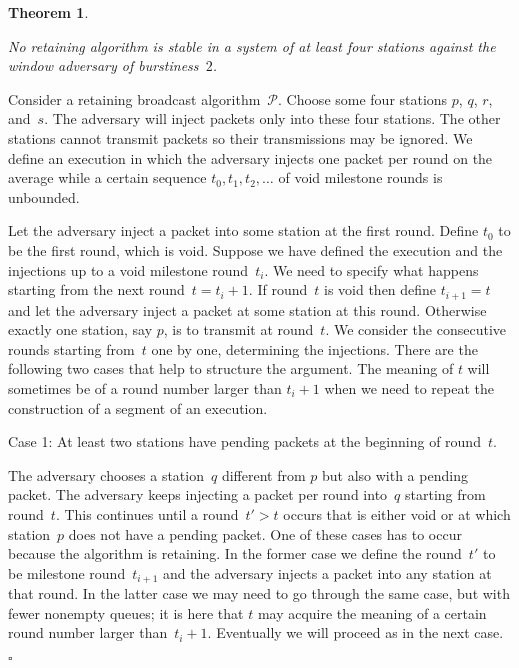 \documentclass[11pt]{article}
\newcommand{\cP}{\mathcal{P}}
\newcommand{\qed}{\hfill $\square$ \smallbreak}
\newenvironment{proof}{\noindent{\bf Proof:}}{\qed}
\newtheorem{theorem}{Theorem}
\begin{document}

\begin{theorem}
\label{thm:impossible-retaining-stable}

No retaining algorithm is stable in a system of at least four stations against the window adversary of burstiness~$2$.
\end{theorem}


\begin{proof}
Consider a retaining broadcast algorithm~$\cP$.
Choose some four stations $p$, $q$, $r$, and~$s$.
The adversary will inject packets only into these four stations.
The other stations cannot transmit packets so their transmissions may be ignored.
We define an execution in which the adversary injects one packet per round on the average
while a certain sequence $t_0, t_1, t_2,\ldots$ of void milestone rounds is unbounded.

Let the adversary inject a packet into some station at the first round. 
Define $t_0$ to be the first round, which is void.
Suppose we have defined the execution and the injections up to a void milestone round~$t_i$.
We need to specify what happens starting from the next round~$t=t_i+1$.
If round~$t$ is void then define $t_{i+1}=t$ and let the adversary inject a packet at some station at this round.
Otherwise exactly one station, say $p$, is to transmit at round~$t$.
We consider the consecutive rounds starting from~$t$ one by one, determining the injections.
There are the following two cases that help to structure the argument.
The meaning of $t$ will sometimes be of a round number larger than $t_i + 1$ when we need to repeat the construction of a segment of an execution.

\noindent
\textsf{Case 1:} At least two stations have pending packets at the beginning of round~$t$.

The adversary chooses a station~$q$ different from $p$ but also with a pending packet.
The adversary keeps injecting a packet per round into~$q$ starting from round~$t$.
This continues until a round~$t'>t$ occurs that is either void or at which station~$p$ does not have a pending packet.
One of these cases has to occur because the algorithm is retaining.
In the former case we define the round~$t'$ to be milestone round~$t_{i+1}$ and the adversary injects a packet into any station at that round.
In the latter case we may need to go through the same case, but with fewer nonempty queues; it is here that $t$ may acquire the meaning of a certain round number larger than~$t_i+1$. 
Eventually we will proceed as in the next case.



\end{proof}
\end{document}
